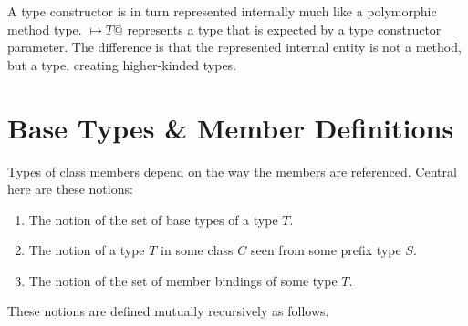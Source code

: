 A type constructor is in turn represented internally much like a polymorphic method type. \lstinline@[$\pm a_1$ >: $L_1$ <: $U_1 \commadots \pm a_n$ >: $L_n$ <: $U_n$] $\mapsto T$@ represents a type that is expected by a type constructor parameter. The difference is that the represented internal entity is not a method, but a type, creating higher-kinded types. 





\section{Base Types \& Member Definitions}
\label{sec:base-types}
\label{sec:member-definitions}

Types of class members depend on the way the members are referenced. Central here are these notions:
\begin{enumerate}
\item The notion of the set of base types of a type $T$.
\item The notion of a type $T$ in some class $C$ seen from some prefix type $S$.
\item The notion of the set of member bindings of some type $T$. 
\end{enumerate}

These notions are defined mutually recursively as follows. 


